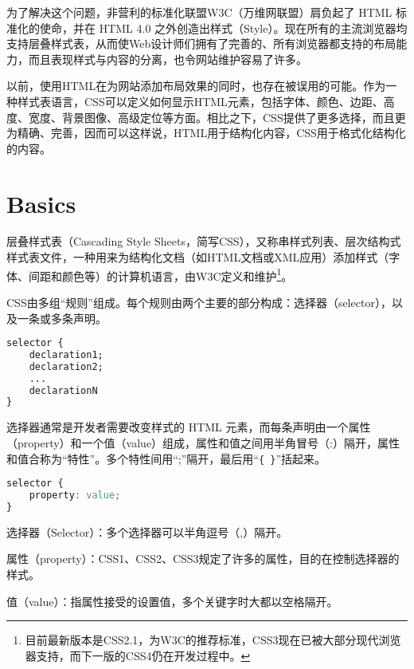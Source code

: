 为了解决这个问题，非营利的标准化联盟W3C（万维网联盟）肩负起了 HTML 标准化的使命，并在 HTML 4.0 之外创造出样式（Style）。现在所有的主流浏览器均支持层叠样式表，从而使Web设计师们拥有了完善的、所有浏览器都支持的布局能力，而且表现样式与内容的分离，也令网站维护容易了许多。





以前，使用HTML在为网站添加布局效果的同时，也存在被误用的可能。作为一种样式表语言，CSS可以定义如何显示HTML元素，包括字体、颜色、边距、高度、宽度、背景图像、高级定位等方面。相比之下，CSS提供了更多选择，而且更为精确、完善，因而可以这样说，HTML用于结构化内容，CSS用于格式化结构化的内容。

\section{Basics}

层叠样式表（Cascading Style Sheets，简写CSS），又称串样式列表、层次结构式样式表文件，一种用来为结构化文档（如HTML文档或XML应用）添加样式（字体、间距和颜色等）的计算机语言，由W3C定义和维护\footnote{目前最新版本是CSS2.1，为W3C的推荐标准，CSS3现在已被大部分现代浏览器支持，而下一版的CSS4仍在开发过程中。}。





CSS由多组“规则”组成。每个规则由两个主要的部分构成：选择器（selector），以及一条或多条声明。

\begin{lstlisting}[language=CSS]
selector {
    declaration1;
    declaration2; 
    ... 
    declarationN
}
\end{lstlisting}

选择器通常是开发者需要改变样式的 HTML 元素，而每条声明由一个属性（property）和一个值（value）组成，属性和值之间用半角冒号（:）隔开，属性和值合称为“特性”。多个特性间用“;”隔开，最后用“\texttt{\{ \}}”括起来。


\begin{lstlisting}[language=CSS]
selector {
    property: value;
}
\end{lstlisting}

\begin{compactitem}
\item 选择器（Selector）：多个选择器可以半角逗号（,）隔开。
\item 属性（property）：CSS1、CSS2、CSS3规定了许多的属性，目的在控制选择器的样式。
\item 值（value）：指属性接受的设置值，多个关键字时大都以空格隔开。
\end{compactitem}


